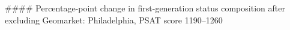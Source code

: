 #### Percentage-point change in first-generation status composition after excluding Geomarket: Philadelphia, PSAT score 1190–1260
